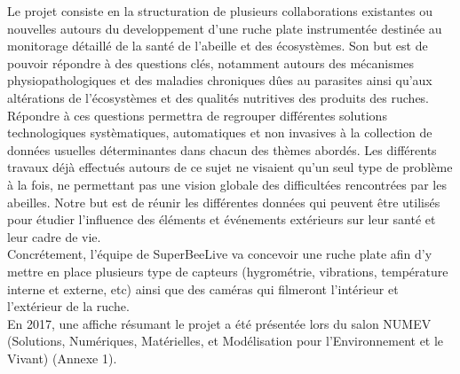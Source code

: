\documentclass[11pt,french,a4paper]{report}
\begin{document}
Le projet consiste en la structuration de plusieurs collaborations existantes ou nouvelles autours du developpement 
d’une ruche plate instrumentée destinée au monitorage détaillé de la santé de l’abeille et des écosystèmes. Son but est de
pouvoir répondre à des questions clés, notamment autours des mécanismes physiopathologiques et des maladies chroniques 
dûes au parasites ainsi qu’aux altérations de l’écosystèmes et des qualités nutritives des produits des ruches. \\
Répondre à ces questions permettra de regrouper différentes solutions technologiques systèmatiques, 
automatiques et non invasives à la collection de données usuelles déterminantes dans chacun des thèmes abordés.
Les différents travaux déjà effectués autours de ce sujet ne visaient qu’un seul type de problème à la fois, 
ne permettant pas une vision globale des difficultées rencontrées par les abeilles. Notre but est de réunir les différentes
données qui peuvent être utilisés pour étudier l’influence des éléments et événements extérieurs sur leur santé et leur cadre de vie.\\

Concrétement, l'équipe de SuperBeeLive va concevoir une ruche plate afin d'y mettre en place plusieurs type de capteurs
(hygrométrie, vibrations, température interne et externe, etc) ainsi que des caméras qui filmeront l'intérieur et 
l'extérieur de la ruche. \\
En 2017, une affiche résumant le projet a été présentée lors du salon NUMEV (Solutions, Numériques, Matérielles, et 
Modélisation pour l'Environnement et le Vivant) (Annexe 1). \\ 
\end{document}
